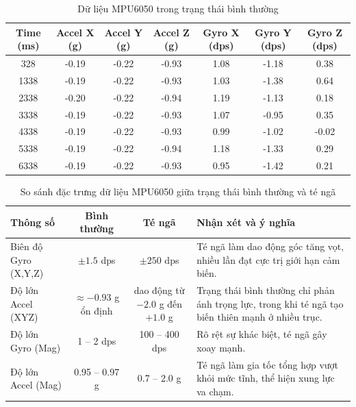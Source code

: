 \begin{table}[H]
\centering
\caption{Dữ liệu MPU6050 trong trạng thái bình thường}
\label{tab:normal_log_data}
\begin{tabular}{|c|c|c|c|c|c|c|}
\hline
\textbf{Time (ms)} & \textbf{Accel X (g)} & \textbf{Accel Y (g)} & \textbf{Accel Z (g)} & \textbf{Gyro X (dps)} & \textbf{Gyro Y (dps)} & \textbf{Gyro Z (dps)} \\
\hline
328  & -0.19 & -0.22 & -0.93 & 1.08 & -1.18 & 0.38 \\
1338 & -0.19 & -0.22 & -0.93 & 1.03 & -1.38 & 0.64 \\
2338 & -0.20 & -0.22 & -0.94 & 1.19 & -1.13 & 0.18 \\
3338 & -0.19 & -0.22 & -0.93 & 1.07 & -0.95 & 0.35 \\
4338 & -0.19 & -0.22 & -0.93 & 0.99 & -1.02 & -0.02 \\
5338 & -0.19 & -0.22 & -0.94 & 1.18 & -1.33 & 0.29 \\
6338 & -0.19 & -0.22 & -0.93 & 0.95 & -1.42 & 0.21 \\
\hline
\end{tabular}
\end{table}

\begin{table}[H]
\centering
\caption{So sánh đặc trưng dữ liệu MPU6050 giữa trạng thái bình thường và té ngã}
\label{tab:mpu6050_new_comparison}
\begin{tabular}{|l|c|c|p{7cm}|}
\hline
\textbf{Thông số} & \textbf{Bình thường} & \textbf{Té ngã} & \textbf{Nhận xét và ý nghĩa} \\
\hline
Biên độ Gyro (X,Y,Z) & $\pm 1.5$ dps & $\pm 250$ dps & Té ngã làm dao động góc tăng vọt, nhiều lần đạt cực trị giới hạn cảm biến. \\
\hline
Độ lớn Accel (XYZ) & $\approx -0.93$ g ổn định & dao động từ $-2.0$ g đến $+1.0$ g & Trạng thái bình thường chỉ phản ánh trọng lực, trong khi té ngã tạo biến thiên mạnh ở nhiều trục. \\
\hline
Độ lớn Gyro (Mag) & 1 -- 2 dps & 100 -- 400 dps & Rõ rệt sự khác biệt, té ngã gây xoay mạnh. \\
\hline
Độ lớn Accel (Mag) & 0.95 -- 0.97 g & 0.7 -- 2.0 g & Té ngã làm gia tốc tổng hợp vượt khỏi mức tĩnh, thể hiện xung lực va chạm. \\
\hline
\end{tabular}
\end{table}

